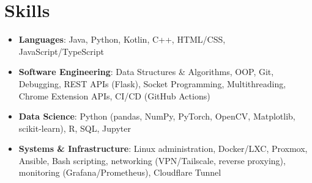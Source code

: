 \documentclass[letterpaper,11pt]{article}
\newcommand{\resumeSubHeadingListStart}{\begin{itemize}[leftmargin=*, itemsep=4pt, topsep=2pt, parsep=0pt]}
\newcommand{\resumeSubHeadingListEnd}{\end{itemize}}
\begin{document}
\section{Skills}
\resumeSubHeadingListStart
\item{
            \textbf{Languages}{: Java, Python, Kotlin, C++, HTML/CSS, JavaScript/TypeScript}
      }
\item{
            \textbf{Software Engineering}{: Data Structures \& Algorithms, OOP, Git, Debugging, REST APIs (Flask), Socket Programming, Multithreading, Chrome Extension APIs, CI/CD (GitHub Actions)}
      }
\item{
            \textbf{Data Science}{: Python (pandas, NumPy, PyTorch, OpenCV, Matplotlib, scikit-learn), R, SQL, Jupyter}
      }
\item{
            \textbf{Systems \& Infrastructure}{: Linux administration, Docker/LXC, Proxmox, Ansible, Bash scripting, networking (VPN/Tailscale, reverse proxying), monitoring (Grafana/Prometheus), Cloudflare Tunnel}
      }
\resumeSubHeadingListEnd


\end{document}
